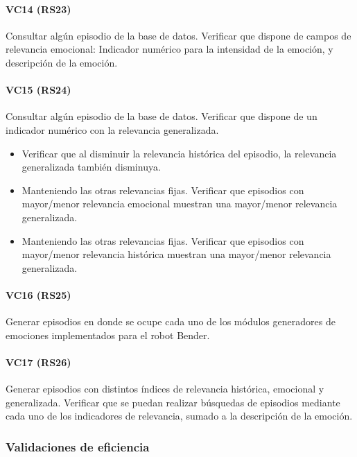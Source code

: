\paragraph{VC14 (RS23)}
Consultar algún episodio de la base de datos. Verificar que dispone de campos de relevancia emocional: Indicador numérico para la intensidad de la emoción, y descripción de la emoción.

\paragraph{VC15 (RS24)}
Consultar algún episodio de la base de datos. Verificar que dispone de un indicador numérico con la relevancia generalizada.
\begin{itemize}
\item Verificar que al disminuir la relevancia histórica del episodio, la relevancia generalizada también disminuya.
\item Manteniendo las otras relevancias fijas. Verificar que episodios con mayor/menor relevancia emocional muestran una mayor/menor relevancia generalizada.
\item Manteniendo las otras relevancias fijas. Verificar que episodios con mayor/menor relevancia histórica muestran una mayor/menor relevancia generalizada.
\end{itemize}

\paragraph{VC16 (RS25)}
Generar episodios en donde se ocupe cada uno de los módulos generadores de emociones implementados para el robot Bender.

\paragraph{VC17 (RS26)}
Generar episodios con distintos índices de relevancia histórica, emocional y generalizada. Verificar que se puedan realizar búsquedas de episodios mediante cada uno de los indicadores de relevancia, sumado a la descripción de la emoción.

\subsubsection{Validaciones de eficiencia}


